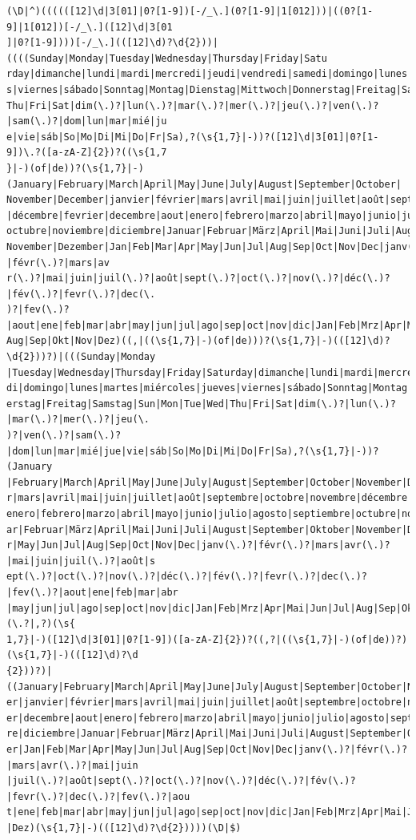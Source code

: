 \documentclass[a4paper,french,10pt]{article}
\begin{document}
\begin{verbatim}
(\D|^)((((([12]\d|3[01]|0?[1-9])[-/_\.](0?[1-9]|1[012]))|((0?[1-9]|1[012])[-/_\.]([12]\d|3[01
]|0?[1-9])))[-/_\.](([12]\d)?\d{2}))|((((Sunday|Monday|Tuesday|Wednesday|Thursday|Friday|Satu
rday|dimanche|lundi|mardi|mercredi|jeudi|vendredi|samedi|domingo|lunes|martes|miércoles|jueve
s|viernes|sábado|Sonntag|Montag|Dienstag|Mittwoch|Donnerstag|Freitag|Samstag|Sun|Mon|Tue|Wed|
Thu|Fri|Sat|dim(\.)?|lun(\.)?|mar(\.)?|mer(\.)?|jeu(\.)?|ven(\.)?|sam(\.)?|dom|lun|mar|mié|ju
e|vie|sáb|So|Mo|Di|Mi|Do|Fr|Sa),?(\s{1,7}|-))?([12]\d|3[01]|0?[1-9])\.?([a-zA-Z]{2})?((\s{1,7
}|-)(of|de))?(\s{1,7}|-)(January|February|March|April|May|June|July|August|September|October|
November|December|janvier|février|mars|avril|mai|juin|juillet|août|septembre|octobre|novembre
|décembre|fevrier|decembre|aout|enero|febrero|marzo|abril|mayo|junio|julio|agosto|septiembre|
octubre|noviembre|diciembre|Januar|Februar|März|April|Mai|Juni|Juli|August|September|Oktober|
November|Dezember|Jan|Feb|Mar|Apr|May|Jun|Jul|Aug|Sep|Oct|Nov|Dec|janv(\.)?|févr(\.)?|mars|av
r(\.)?|mai|juin|juil(\.)?|août|sept(\.)?|oct(\.)?|nov(\.)?|déc(\.)?|fév(\.)?|fevr(\.)?|dec(\.
)?|fev(\.)?|aout|ene|feb|mar|abr|may|jun|jul|ago|sep|oct|nov|dic|Jan|Feb|Mrz|Apr|Mai|Jun|Jul|
Aug|Sep|Okt|Nov|Dez)((,|((\s{1,7}|-)(of|de)))?(\s{1,7}|-)(([12]\d)?\d{2}))?)|(((Sunday|Monday
|Tuesday|Wednesday|Thursday|Friday|Saturday|dimanche|lundi|mardi|mercredi|jeudi|vendredi|same
di|domingo|lunes|martes|miércoles|jueves|viernes|sábado|Sonntag|Montag|Dienstag|Mittwoch|Donn
erstag|Freitag|Samstag|Sun|Mon|Tue|Wed|Thu|Fri|Sat|dim(\.)?|lun(\.)?|mar(\.)?|mer(\.)?|jeu(\.
)?|ven(\.)?|sam(\.)?|dom|lun|mar|mié|jue|vie|sáb|So|Mo|Di|Mi|Do|Fr|Sa),?(\s{1,7}|-))?(January
|February|March|April|May|June|July|August|September|October|November|December|janvier|févrie
r|mars|avril|mai|juin|juillet|août|septembre|octobre|novembre|décembre|fevrier|decembre|aout|
enero|febrero|marzo|abril|mayo|junio|julio|agosto|septiembre|octubre|noviembre|diciembre|Janu
ar|Februar|März|April|Mai|Juni|Juli|August|September|Oktober|November|Dezember|Jan|Feb|Mar|Ap
r|May|Jun|Jul|Aug|Sep|Oct|Nov|Dec|janv(\.)?|févr(\.)?|mars|avr(\.)?|mai|juin|juil(\.)?|août|s
ept(\.)?|oct(\.)?|nov(\.)?|déc(\.)?|fév(\.)?|fevr(\.)?|dec(\.)?|fev(\.)?|aout|ene|feb|mar|abr
|may|jun|jul|ago|sep|oct|nov|dic|Jan|Feb|Mrz|Apr|Mai|Jun|Jul|Aug|Sep|Okt|Nov|Dez)(\.?|,?)(\s{
1,7}|-)([12]\d|3[01]|0?[1-9])([a-zA-Z]{2})?((,?|((\s{1,7}|-)(of|de))?)(\s{1,7}|-)(([12]\d)?\d
{2}))?)|((January|February|March|April|May|June|July|August|September|October|November|Decemb
er|janvier|février|mars|avril|mai|juin|juillet|août|septembre|octobre|novembre|décembre|fevri
er|decembre|aout|enero|febrero|marzo|abril|mayo|junio|julio|agosto|septiembre|octubre|noviemb
re|diciembre|Januar|Februar|März|April|Mai|Juni|Juli|August|September|Oktober|November|Dezemb
er|Jan|Feb|Mar|Apr|May|Jun|Jul|Aug|Sep|Oct|Nov|Dec|janv(\.)?|févr(\.)?|mars|avr(\.)?|mai|juin
|juil(\.)?|août|sept(\.)?|oct(\.)?|nov(\.)?|déc(\.)?|fév(\.)?|fevr(\.)?|dec(\.)?|fev(\.)?|aou
t|ene|feb|mar|abr|may|jun|jul|ago|sep|oct|nov|dic|Jan|Feb|Mrz|Apr|Mai|Jun|Jul|Aug|Sep|Okt|Nov
|Dez)(\s{1,7}|-)(([12]\d)?\d{2}))))(\D|$)
\end{verbatim}
\end{document}
